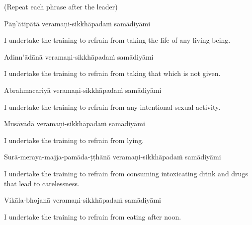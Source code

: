 \begin{center}
  (Repeat each phrase after the leader)
\end{center}

Pāṇ'ātipātā veramaṇi-sikkhāpadaṁ samādiyāmi

\begin{english-hang}
  I undertake the training to refrain from taking the life of any living being.
\end{english-hang}

Adinn'ādānā veramaṇi-sikkhāpadaṁ samādiyāmi

\begin{english-hang}
  I undertake the training to refrain from taking that which is not given.
\end{english-hang}

Abrahmacariyā veramaṇi-sikkhāpadaṁ samādiyāmi

\begin{english-hang}
  I undertake the training to refrain from any intentional sexual activity.
\end{english-hang}

Musāvādā veramaṇi-sikkhāpadaṁ samādiyāmi

\begin{english}
  I undertake the training to refrain from lying.
\end{english}

\begin{pali-hang}
  Surā-meraya-majja-pamāda-ṭṭhānā veramaṇi-sikkhāpadaṁ samādiyāmi
\end{pali-hang}

\begin{english-hang}
  I undertake the training to refrain from consuming intoxicating drink and drugs that\ifdigitalversion\makeatletter\hyperlink{endnote141-appendix}\makeatother\fi
  lead to carelessness.
\end{english-hang}

Vikāla-bhojanā veramaṇi-sikkhāpadaṁ samādiyāmi

\begin{english}
  I undertake the training to refrain from eating after noon.\ifdigitalversion\makeatletter\hyperlink{endnote142-appendix}\makeatother\fi
\end{english}

